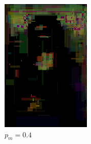 \begin{figure}[!htb]
\begin{subfigure}[b]{0.3\textwidth}
         \includegraphics[width=\textwidth]{images/mona/1000_300_2/mutation/0_4.png}
         \caption{$p_{m} = 0.4$}
    \end{subfigure}
    \begin{subfigure}[b]{0.3\textwidth}
        \centering
        \label{fig:mutation_0_6}

\end{subfigure}
\end{figure}

